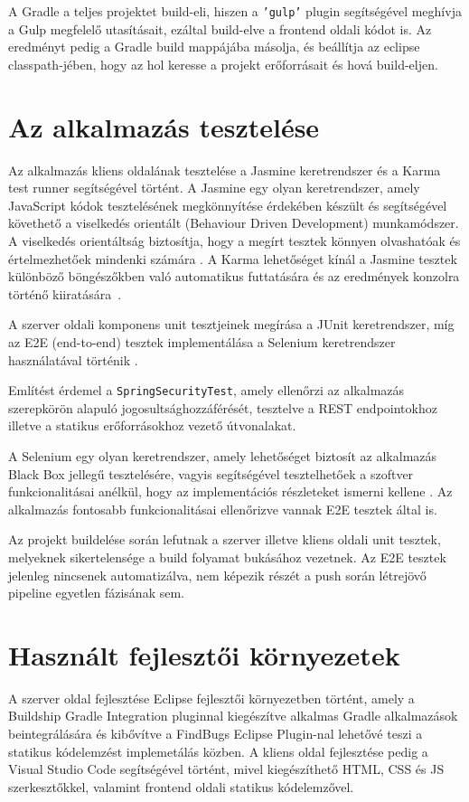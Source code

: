 A Gradle a teljes projektet build-eli, hiszen a \texttt{'gulp'} plugin segítségével meghívja a Gulp megfelelő utasításait, ezáltal build-elve a frontend oldali kódot is. Az eredményt pedig a Gradle build mappájába másolja, és beállítja az eclipse classpath-jében, hogy az hol keresse a projekt erőforrásait és hová build-eljen. 

\section{Az alkalmazás tesztelése}
\label{sec:tesztek}

Az alkalmazás kliens oldalának tesztelése a Jasmine keretrendszer és a Karma test runner segítségével történt. A Jasmine egy olyan keretrendszer, amely JavaScript kódok tesztelésének megkönnyítése érdekében készült és segítségével követhető a viselkedés orientált (Behaviour Driven Development) munkamódszer. A viselkedés orientáltság biztosítja, hogy a megírt tesztek könnyen olvashatóak és értelmezhetőek mindenki számára \cite{Jasmine}. A Karma lehetőséget kínál a Jasmine tesztek különböző böngészőkben való automatikus futtatására és az eredmények konzolra történő kiiratására~\cite{KarmaJasmine}.

A szerver oldali komponens unit tesztjeinek megírása a JUnit keretrendszer, míg az E2E (end-to-end) tesztek implementálása a Selenium keretrendszer használatával történik \cite{Selenium}.  

Említést érdemel a \texttt{SpringSecurityTest}, amely ellenőrzi az alkalmazás szerepkörön alapuló jogosultsághozzáférését, tesztelve a REST endpointokhoz illetve a statikus erőforrásokhoz vezető útvonalakat. 

A Selenium egy olyan keretrendszer, amely lehetőséget biztosít az alkalmazás Black Box jellegű tesztelésére, vagyis segítségével tesztelhetőek a szoftver funkcionalitásai anélkül, hogy az implementációs részleteket ismerni kellene \cite{Selenium}. Az alkalmazás fontosabb funkcionalitásai ellenőrizve vannak E2E tesztek által is.

Az projekt buildelése során lefutnak a szerver illetve kliens oldali unit tesztek, melyeknek sikertelensége a build folyamat bukásához vezetnek. Az E2E tesztek jelenleg nincsenek automatizálva, nem képezik részét a push során létrejövő pipeline egyetlen fázisának sem. 

\section{Használt fejlesztői környezetek}
\label{subsec:fejleszoiKornyezet}

A szerver oldal fejlesztése Eclipse \cite{Eclipse} fejlesztői környezetben történt, amely a Buildship Gradle Integration pluginnal \cite{GradlePlugin} kiegészítve alkalmas Gradle alkalmazások beintegrálására és kibővítve a FindBugs Eclipse Plugin-nal\cite{FindBugsEclipsePlugin} lehetővé teszi a statikus kódelemzést implemetálás közben. A kliens oldal fejlesztése pedig a Visual Studio Code \cite{VSCode} segítségével történt, mivel kiegészíthető HTML, CSS és JS szerkesztőkkel, valamint frontend oldali statikus kódelemzővel. 
